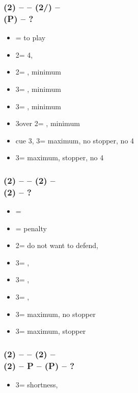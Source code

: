 \documentclass[12pt, a4paper]{report}
\begin{document}
        \subsubsection*{(2\diams) -- \dbl -- (2\hearts/\spades) -- \dbl \\
                        (P) -- ?}        
        \begin{itemize}
            \item \pass = to play
            \item 2\spades = 4\spades, \fonce
            \item 2\nt = \nat, minimum
            \item 3\clubs = \nat, minimum
            \item 3\diams = \nat, minimum
            \item 3\hearts over 2\spades = \nat, minimum
            \item cue 3\hearts, 3\spades = maximum, no stopper, no 4\spades
            \item 3\nt = maximum, stopper, no 4\spades
        \end{itemize}

        \subsubsection*{(2\diams) -- \dbl -- (2\hearts) -- \dbl \\
                        (2\spades) -- ?}        
        \begin{itemize}
            \item \pass = \fonce
            \item \dbl = penalty
            \item 2\nt = do not want to defend, \gf
            \item 3\clubs = \nat, \gf
            \item 3\diams = \nat, \gf
            \item 3\hearts = \nat, \gf
            \item 3\spades = maximum, no \spades stopper
            \item 3\nt = maximum, stopper
        \end{itemize}

        \subsubsection*{(2\diams) -- \dbl -- (2\hearts) -- \dbl \\
                        (2\spades) -- P -- (P) -- ?}
        \begin{itemize}
            \item 3\spades = \spades shortness, \gf %
        \end{itemize}
\end{document}
